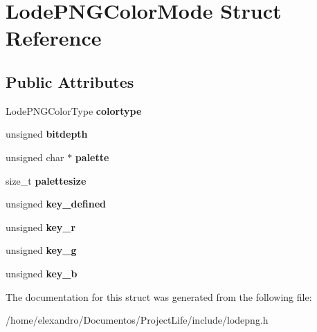 \section{Lode\+P\+N\+G\+Color\+Mode Struct Reference}
\label{struct_lode_p_n_g_color_mode}
\subsection*{Public Attributes}
\begin{DoxyCompactItemize}
\item 
\mbox{\label{struct_lode_p_n_g_color_mode_a4f3df7240411abe80546052d197fbe8d}} 
Lode\+P\+N\+G\+Color\+Type {\bfseries colortype}
\item 
\mbox{\label{struct_lode_p_n_g_color_mode_ad20010b9561980f65281bc17f7848253}} 
unsigned {\bfseries bitdepth}
\item 
\mbox{\label{struct_lode_p_n_g_color_mode_a54f0a793238009fcb95f081626fae308}} 
unsigned char $\ast$ {\bfseries palette}
\item 
\mbox{\label{struct_lode_p_n_g_color_mode_a407557f056168682d9319aeb60866dcc}} 
size\+\_\+t {\bfseries palettesize}
\item 
\mbox{\label{struct_lode_p_n_g_color_mode_ab9105505c5d56cfc6ce4efe1bb288b54}} 
unsigned {\bfseries key\+\_\+defined}
\item 
\mbox{\label{struct_lode_p_n_g_color_mode_a29e64327bca1f3d16235e9ff471e4d50}} 
unsigned {\bfseries key\+\_\+r}
\item 
\mbox{\label{struct_lode_p_n_g_color_mode_ad98309f36d289392b0c440baa50af9f6}} 
unsigned {\bfseries key\+\_\+g}
\item 
\mbox{\label{struct_lode_p_n_g_color_mode_a93a269405fee0d1c5045a1a671ed1de8}} 
unsigned {\bfseries key\+\_\+b}
\end{DoxyCompactItemize}


The documentation for this struct was generated from the following file\+:\begin{DoxyCompactItemize}
\item 
/home/elexandro/\+Documentos/\+Project\+Life/include/lodepng.\+h\end{DoxyCompactItemize}
